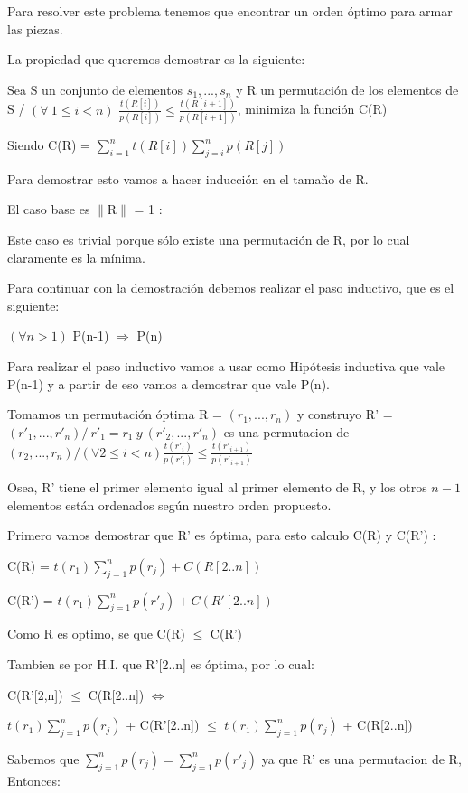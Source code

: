 Para resolver este problema tenemos que encontrar un orden óptimo para armar las piezas.

La propiedad que queremos demostrar es la siguiente:

Sea S un conjunto de elementos  ${s_1,...,s_n}$ y R un permutación de los elementos de S / $(\forall \ 1 \leq i  < n)$ $\frac{t(R[i])}{p(R[i])} \leq \frac{t(R[i+1])}{p(R[i+1])} $, minimiza la función C(R) 

Siendo C(R) = $\sum_{i=1}^{n} t(R[i]) \sum_{j=i}^{n}p(R[j]) $

Para demostrar esto vamos a hacer inducción en el tamaño de R.

El caso base  es $\|$R$\|$ = 1 :

Este caso es trivial porque sólo existe una permutación de R, por lo cual claramente es la mínima.

Para continuar con la demostración debemos realizar el paso inductivo, que es el siguiente:

$(\forall n > 1)$  P(n-1) $\Rightarrow$ P(n)

Para realizar el paso inductivo vamos a usar como Hipótesis inductiva que vale P(n-1) y a partir de eso vamos a demostrar que vale P(n).

Tomamos un permutación óptima R = $(r_1,...,r_n)$ y construyo R' = $(r'_1,...,r'_n) / \  r'_1 = r_1 \  y \ (r'_2,...,r'_n)$ es una permutacion de $(r_2,...,r_n) / (\forall 2 \leq i  < n) \frac{t(r'_i)}{p(r'_i)} \leq \frac{t(r'_{i+1})}{p(r'_{i+1})} $

Osea, R' tiene el primer elemento igual al primer elemento de R, y los otros $n-1$ elementos están ordenados según nuestro orden propuesto.

Primero vamos demostrar que R' es óptima, para esto calculo C(R) y C(R') :

C(R) = $t(r_1) \sum_{j=1}^{n}p(r_j) + C(R[2..n]) $

C(R') = $t(r_1) \sum_{j=1}^{n}p(r'_j) + C(R'[2..n]) $

Como R es optimo, se que C(R) $\leq$ C(R')

Tambien se por H.I. que R'[2..n] es óptima, por lo cual: 

C(R'[2,n]) $\leq$ C(R[2..n]) $\iff$

$t(r_1) \sum_{j=1}^{n}p(r_j)$ + C(R'[2..n]) $\leq$  $t(r_1) \sum_{j=1}^{n}p(r_j)$ + C(R[2..n])

Sabemos que $\sum_{j=1}^{n}p(r_j) = \sum_{j=1}^{n}p(r'_j)$ ya que R' es una permutacion de R, Entonces:

